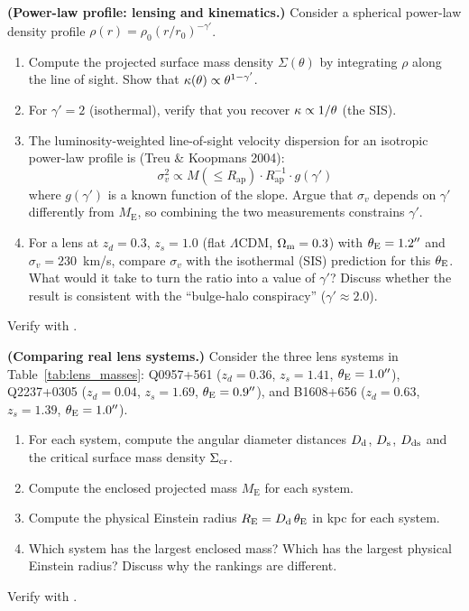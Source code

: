 \begin{exercise}
\label{ex:power_law_profile}
\textbf{(Power-law profile: lensing and kinematics.)}
Consider a spherical power-law density profile
$\rho(r) = \rho_0 (r/r_0)^{-\gamma'}$.
\begin{enumerate}[label=(\alph*)]
    \item Compute the projected surface mass density
          $\Sigma(\theta)$ by integrating $\rho$ along the line of
          sight.  Show that
          $\kappa(\theta) \propto \theta^{1-\gamma'}$.
    \item For $\gamma' = 2$ (isothermal), verify that you recover
          $\kappa \propto 1/\theta$ (the SIS).
    \item The luminosity-weighted line-of-sight velocity dispersion
          for an isotropic power-law profile is (Treu \& Koopmans
          2004):
          \[
              \sigma_v^2 \propto M(\le R_{\mathrm{ap}}) \cdot
              R_{\mathrm{ap}}^{-1} \cdot g(\gamma')
          \]
          where $g(\gamma')$ is a known function of the slope.
          Argue that $\sigma_v$ depends on $\gamma'$ differently
          from $M_{\mathrm{E}}$, so combining the two measurements
          constrains $\gamma'$.
    \item For a lens at $z_d = 0.3$, $z_s = 1.0$ (flat $\Lambda$CDM,
          $\Omega_{\mathrm{m}} = 0.3$) with $\theta_{\mathrm{E}} = 1.2''$ and
          $\sigma_v = 230$~km/s, compare $\sigma_v$ with the
          isothermal (SIS) prediction for this $\theta_{\mathrm{E}}$.  What would
          it take to turn the ratio into a value of $\gamma'$?  Discuss
          whether the result is consistent with the ``bulge-halo
          conspiracy'' ($\gamma' \approx 2.0$).
\end{enumerate}
Verify with
.
\end{exercise}

\begin{exercise}
\label{ex:compare_lenses}
\textbf{(Comparing real lens systems.)}
Consider the three lens systems in Table~\ref{tab:lens_masses}:
Q0957+561 ($z_d = 0.36$, $z_s = 1.41$, $\theta_{\mathrm{E}} = 1.0''$),
Q2237+0305 ($z_d = 0.04$, $z_s = 1.69$, $\theta_{\mathrm{E}} = 0.9''$), and
B1608+656 ($z_d = 0.63$, $z_s = 1.39$, $\theta_{\mathrm{E}} = 1.0''$).
\begin{enumerate}[label=(\alph*)]
    \item For each system, compute the angular diameter distances
          $D_{\mathrm{d}}$, $D_{\mathrm{s}}$, $D_{\mathrm{ds}}$ and the critical surface mass
          density $\Sigma_{\mathrm{cr}}$.
    \item Compute the enclosed projected mass $M_{\mathrm{E}}$ for
          each system.
    \item Compute the physical Einstein radius $R_{\mathrm{E}} =
          D_{\mathrm{d}}\,\theta_{\mathrm{E}}$ in kpc for each system.
    \item Which system has the largest enclosed mass?  Which has the
          largest physical Einstein radius?  Discuss why the rankings
          are different.
\end{enumerate}
Verify with
.
\end{exercise}
